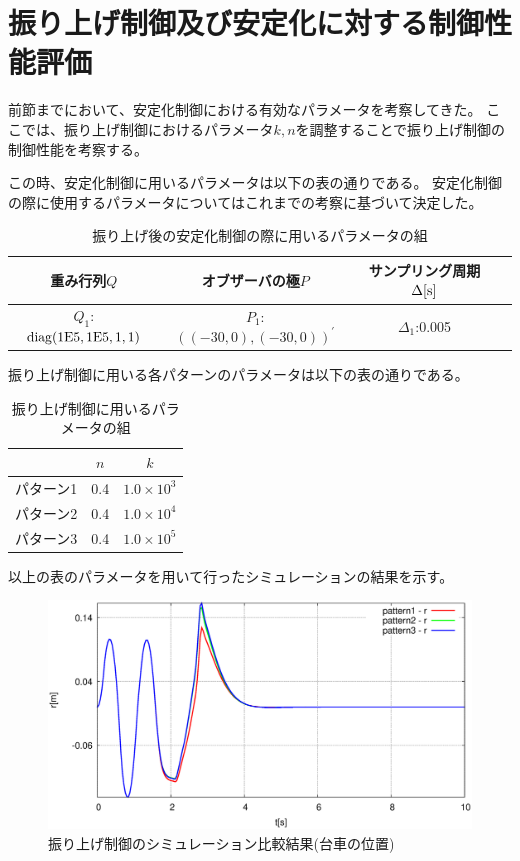 \section{振り上げ制御及び安定化に対する制御性能評価}
	前節までにおいて、安定化制御における有効なパラメータを考察してきた。
	ここでは、振り上げ制御におけるパラメータ$k,n$を調整することで振り上げ制御の制御性能を考察する。
	\par
	この時、安定化制御に用いるパラメータは以下の表の通りである。
	安定化制御の際に使用するパラメータについてはこれまでの考察に基づいて決定した。
	\begin{table}[H]
		\begin{center}
			\caption{振り上げ後の安定化制御の際に用いるパラメータの組}
			\medskip
			
			\begin{tabular}{|c|c|c|c|}\hline
				重み行列$Q$ & オブザーバの極$P$ & サンプリング周期$\Delta[\rm{s}]$ \\ \hline\hline
				$Q_1$:$\rm{diag}(1E5,1E5,1,1)$ & $P_1$:$((-30,0),(-30,0))^{'}$ & $\Delta_1$:0.005 \\ \hline
			\end{tabular}
		\end{center}
		\label{table:huriage_control}
	\end{table}
	振り上げ制御に用いる各パターンのパラメータは以下の表の通りである。
	\begin{table}[H]
		\begin{center}
			\caption{振り上げ制御に用いるパラメータの組}
			\medskip
			
			\begin{tabular}{|c|c|c|}\hline
				& $n$ & $k$ \\ \hline\hline
				パターン1 & 0.4 & $1.0×10^3$  \\ \hline
				パターン2 & 0.4 & $1.0×10^4$  \\ \hline
				パターン3 & 0.4 & $1.0×10^5$  \\ \hline
			\end{tabular}
		\end{center}
		\label{table:huriage_huriage}
	\end{table}
	以上の表のパラメータを用いて行ったシミュレーションの結果を示す。
	\begin{figure}[H]
		\centering
		\includegraphics[width=0.8\linewidth]{gazo/Hsimu_R.eps}
		\caption{振り上げ制御のシミュレーション比較結果(台車の位置)}
		\label{image:simu_huriageR}
	\end{figure}
